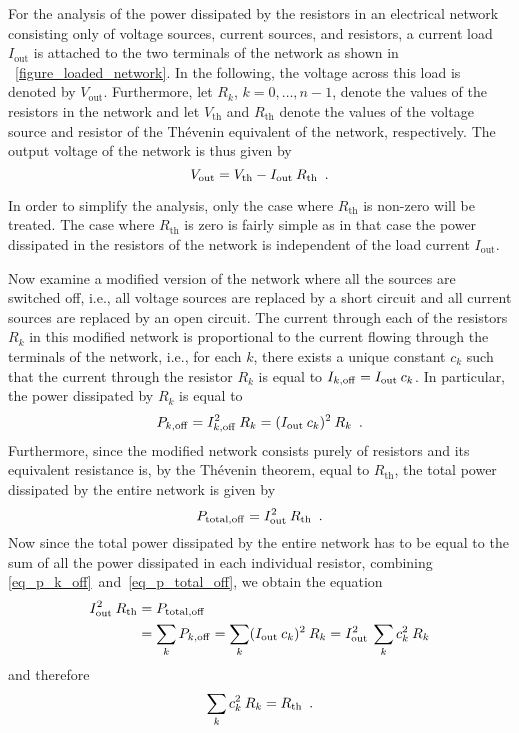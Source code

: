 \documentclass[twoside]{IEEEtran}
\newcommand{\mult}{\nonscript\:}
\newcommand{\opoff}{{\operatorname{off}}}
\newcommand{\opout}{{\operatorname{out}}}
\newcommand{\opth}{{\operatorname{th}}}
\newcommand{\optotal}{{\operatorname{total}}}
\begin{document}
For the analysis of the power dissipated by the resistors in an electrical network consisting only of voltage sources, current sources, and resistors, a current load $I_{\opout}$ is attached to the two terminals of the network as shown in \figurename~\ref{figure_loaded_network}.
In the following, the voltage across this load is denoted by $V_{\opout}$.
Furthermore, let $R_{k}$, $k = 0, \ldots, n - 1$, denote the values of the resistors in the network and let $V_{\opth}$ and $R_{\opth}$ denote the values of the voltage source and resistor of the Th\'{e}venin equivalent of the network, respectively.
The output voltage of the network is thus given by
\begin{equation}
    V_{\opout}
  = V_{\opth} - I_{\opout} \mult R_{\opth}
  \enskip .
  \label{eq_v_out}
\end{equation}

In order to simplify the analysis, only the case where $R_{\opth}$ is non-zero will be treated.
The case where $R_{\opth}$ is zero is fairly simple as in that case the power dissipated in the resistors of the network is independent of the load current $I_{\opout}$.

Now examine a modified version of the network where all the sources are switched off, i.e., all voltage sources are replaced by a short circuit and all current sources are replaced by an open circuit.
The current through each of the resistors $R_{k}$ in this modified network is proportional to the current flowing through the terminals of the network, i.e., for each $k$, there exists a unique constant $c_{k}$ such that the current through the resistor $R_{k}$ is equal to $I_{k, \opoff} = I_{\opout} \mult c_{k}$.
In particular, the power dissipated by $R_{k}$ is equal to
\begin{equation}
    P_{k, \opoff}
  = I_{k, \opoff}^{2} \mult R_{k}
  = (I_{\opout} \mult c_{k})^{2} \mult R_{k}
  \enskip .
  \label{eq_p_k_off}
\end{equation}
Furthermore, since the modified network consists purely of resistors and its equivalent resistance is, by the Th\'{e}venin theorem, equal to $R_{\opth}$, the total power dissipated by the entire network is given by
\begin{equation}
    P_{\optotal, \opoff}
  = I_{\opout}^{2} \mult R_{\opth}
  \enskip .
  \label{eq_p_total_off}
\end{equation}
Now since the total power dissipated by the entire network has to be equal to the sum of all the power dissipated in each individual resistor, combining \eqref{eq_p_k_off}~and~\eqref{eq_p_total_off}, we obtain the equation
\begin{align*}
         I_{\opout}^{2} \mult R_{\opth}
     & = P_{\optotal, \opoff}
  \\ & = \sum_{k} P_{k, \opoff}
       = \sum_{k} (I_{\opout} \mult c_{k})^{2} \mult R_{k}
       = I_{\opout}^{2} \mult \sum_{k} c_{k}^{2} \mult R_{k}
\end{align*}
and therefore
\begin{equation}
    \sum_{k} c_{k}^{2} \mult R_{k}
  = R_{\opth}
  \enskip .
  \label{eq_leading_coefficient}
\end{equation}
\end{document}
